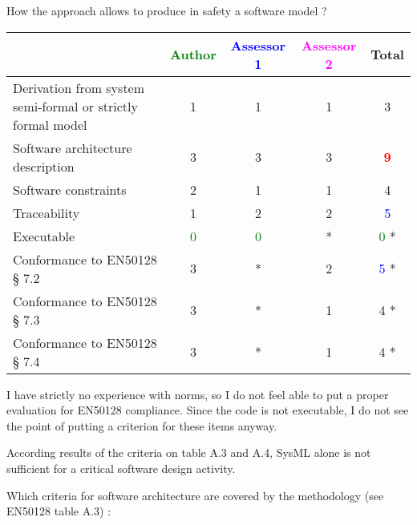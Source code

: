 How the approach allows to produce in safety a software model ?

\begin{tabular}{|l | c | c | c | c|}
\hline
& \textcolor{green}{Author} & \textcolor{blue}{Assessor 1} & \textcolor{magenta}{Assessor 2} & Total \\
\hline
Derivation from system semi-formal or strictly formal model & 1     & 1     & 1     & 3     \\
\hline
Software architecture description & 3     & 3     & 3     & \textcolor{red}{\textbf{9}} \\
\hline
Software constraints & 2     & 1     & 1     & 4     \\
\hline
Traceability & 1     & 2     & 2     & \textcolor{blue}{5} \\
\hline
Executable & \textcolor{green}{0} & \textcolor{green}{0} & * & \textcolor{green}{0} * \\
\hline
Conformance to EN50128 § 7.2 & 3     & * & 2     & \textcolor{blue}{5} * \\
\hline
Conformance to EN50128 § 7.3 & 3     & * & 1     & 4    * \\
\hline
Conformance to EN50128 § 7.4 & 3     & * & 1     & 4    * \\
\hline
\end{tabular}

\begin{assessor1}
I have strictly no experience with norms, so I do not feel able to put a proper evaluation for EN50128 compliance. Since the code is not executable, I do not see the point of putting a criterion for these items anyway. 
\end{assessor1}


\begin{assessor2}
According results of the criteria on table A.3 and A.4, SysML alone is not sufficient for a critical software design activity.
\end{assessor2}


Which criteria for software architecture are covered by the methodology
(see EN50128 table A.3) :

